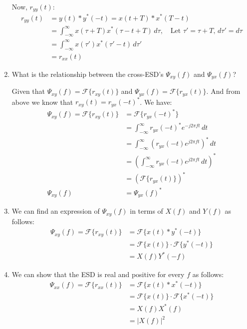 \documentclass{article}
\begin{document}
\begin{enumerate}[label=2.\arabic*]
    Now, $r_{yy}(t)$:
    \begin{align*}
        r_{yy}(t) &= y(t) \ast y^*(-t) = x(t+T) \ast x^*(T - t) \\
        &= \int_{-\infty}^{\infty} x(\tau + T)x^*(\tau - t + T) \, d\tau, \quad \text {Let } \tau' = \tau + T, \, d\tau' = d\tau \\
        &= \int_{-\infty}^{\infty} x(\tau')x^*(\tau' - t) \, d\tau' \\
        &= r_{xx}(t)
    \end{align*}

    \item What is the relationship between the cross-ESD's $\Psi_{xy}(f)$ and $\Psi_{yx}(f)$?

    Given that $\Psi_{xy}(f) = \mathcal{F}\{r_{xy}(t)\}$ and $\Psi_{yx}(f) = \mathcal{F}\{r_{yx}(t)\}$. And from above we know that $r_{xy}(t) = r_{yx}(-t)^\ast$. We have:
    \begin{align*}
        \Psi_{xy}(f) = \mathcal{F}\{r_{xy}(t)\} &= \mathcal{F}\{r_{yx}(-t)^\ast\} \\
        &= \int_{-\infty}^{\infty} r_{yx}(-t)^\ast e^{-j2\pi ft} \, dt \\
        &= \int_{-\infty}^{\infty} \left(r_{yx}(-t) e^{j2\pi ft}\right)^\ast \, dt \\
        &= \left(\int_{-\infty}^{\infty} r_{yx}(-t) e^{j2\pi ft} \, dt\right)^\ast \\
        &= \left(\mathcal{F}\{r_{yx}(t)\}\right)^\ast \\
       \Psi_{xy}(f) &= \Psi_{yx}(f)^\ast
    \end{align*}

    \item We can find an expression of $\Psi_{xy}(f)$ in terms of $X(f)$ and $Y(f)$ as follows:
    \begin{align*}
        \Psi_{xy}(f) = \mathcal{F}\{r_{xy}(t)\} &= \mathcal{F}\{x(t) \ast y^*(-t)\} \\
        &= \mathcal{F}\{x(t)\} \cdot \mathcal{F}\{y^*(-t)\} \\
        &= X(f)Y^*(-f)
    \end{align*}

    \item We can show that the ESD is real and positive for every $f$ as follows:
    \begin{align*}
        \Psi_{xx}(f) = \mathcal{F}\{r_{xx}(t)\} &= \mathcal{F}\{x(t) \ast x^*(-t)\} \\
        &= \mathcal{F}\{x(t)\} \cdot \mathcal{F}\{x^*(-t)\} \\
        &= X(f)X^*(f) \\
        &= |X(f)|^2
    \end{align*}


\end{enumerate}
\end{document}
